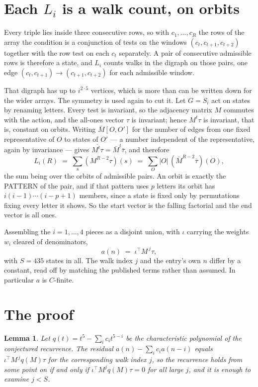 \documentclass[11pt,a4paper]{article}
\theoremstyle{plain}
\newtheorem{lemma}[theorem]{Lemma}
\theoremstyle{definition}
\begin{document}
\section{Each $L_i$ is a walk count, on orbits}

Every triple lies inside three consecutive rows, so with $c_1,\dots,c_R$ the rows of the array
the condition is a conjunction of tests on the windows $(c_{t},c_{t+1},c_{t+2})$ together
with the row test on each $c_t$ separately. A pair of consecutive admissible rows is therefore
a state, and $L_i$ counts walks in the digraph on those pairs, one edge $(c_t,c_{t+1})\to
(c_{t+1},c_{t+2})$ for each admissible window.

That digraph has up to $i^{2\cdot5}$ vertices, which is more than can be written down for
the wider arrays. The symmetry is used again to cut it. Let $G=S_i$ act on states by renaming
letters. Every test is invariant, so the adjacency matrix $M$ commutes with the action, and the
all-ones vector $\tau$ is invariant; hence $M^{t}\tau$ is invariant, that is, constant on
orbits. Writing $\bar M[O,O']$ for the number of edges from one fixed representative of $O$ to
states of $O'$ --- a number independent of the representative, again by invariance --- gives
$\overline{M^{t}\tau}=\bar M^{t}\bar\tau$, and therefore
\[
L_i(R)\;=\;\sum_{s}(M^{R-2}\tau)(s)\;=\;\sum_{O}|O|\,(\bar M^{R-2}\bar\tau)(O),
\]
the sum being over the orbits of admissible pairs. An orbit is exactly the PATTERN of the pair,
and if that pattern uses $p$ letters its orbit has $i(i-1)\cdots(i-p+1)$ members, since a state
is fixed only by permutations fixing every letter it shows. So the start vector is the falling
factorial and the end vector is all ones.

Assembling the $i=1,\dots,4$ pieces as a disjoint union, with $\iota$ carrying the weights
$w_i$ cleared of denominators,
\[
a(n)\;=\;\iota^{\!\top}M^{\,j}\tau ,
\]
with $S=435$ states in all. The walk index $j$ and the entry's own $n$ differ by a constant,
read off by matching the published terms rather than assumed. In particular $a$ is $C$-finite.

\section{The proof}

\begin{lemma}\label{lem:crit}
Let $q(t)=t^{5}-\sum_i c_it^{5-i}$ be the characteristic polynomial of the
conjectured recurrence. The residual $a(n)-\sum_ic_ia(n-i)$ equals
$\iota^{\!\top}M^{\,j}q(M)\tau$ for the corresponding walk index $j$, so the recurrence
holds from some point on if and only if $\iota^{\!\top}M^{j}q(M)\tau=0$ for all large $j$,
and it is enough to examine $j<S$.
\end{lemma}
\end{document}
